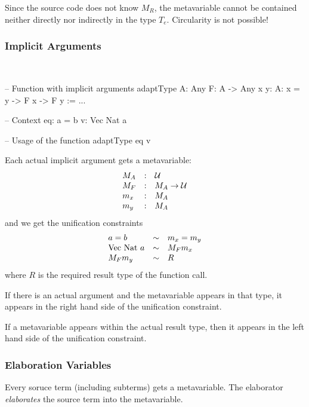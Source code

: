 Since the source code does not know $M_R$, the metavariable cannot be contained
neither directly nor indirectly in the type $T_e$. Circularity is not possible!



\subsubsection{Implicit Arguments}

\ \begin{alba}
    -- Function with implicit arguments
    adaptType {A: Any} {F: A -> Any} {x y: A}: x = y -> F x -> F y := ...

    -- Context
    eq: a = b
    v:  Vec Nat a

    -- Usage of the function
    adaptType eq v
\end{alba}

Each actual implicit argument gets a metavariable:
$$
\begin{array}{lllll} 
    M_A  &:&  {\mathcal U}
    \\
    M_F  &:&  M_A \to {\mathcal U}
    \\
    m_x  &:&  M_A
    \\
    m_y  &:&  M_A
 \end{array}
$$
and we get the unification constraints
$$
\begin{array}{lllll} 
    a = b              &\sim&    m_x = m_y
    \\
    \text{Vec Nat } a  &\sim&    M_F m_x
    \\
    M_F m_y            &\sim&    R
 \end{array}
$$
where $R$ is the required result type of the function call.

If there is an actual argument and the metavariable appears in that type, it
appears in the right hand side of the unification constraint.

If a metavariable appears within the actual result type, then it appears in the
left hand side of the unification constraint.



\subsubsection{Elaboration Variables}

Every soruce term (including subterms) gets a metavariable. The elaborator
\emph{elaborates} the source term into the metavariable.






